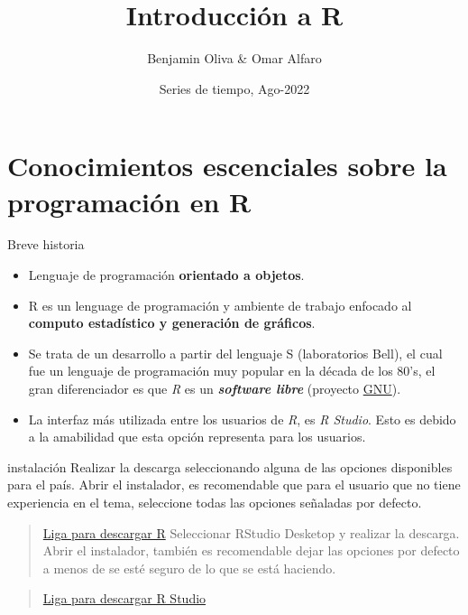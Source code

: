 \documentclass[
  10,
  ignorenonframetext,
]{beamer}
\title{Introducción a R}
\author{Benjamin Oliva \& Omar Alfaro}
\date{Series de tiempo, Ago-2022}
\begin{document}
\frame{\titlepage}

\begin{frame}[allowframebreaks]
  \tableofcontents[hideallsubsections]
\end{frame}
\hypertarget{conocimientos-escenciales-sobre-la-programaciuxf3n-en-r}{%
\section{Conocimientos escenciales sobre la programación en
R}\label{conocimientos-escenciales-sobre-la-programaciuxf3n-en-r}}

\begin{frame}{Breve historia}
\protect\hypertarget{breve-historia}{}
\begin{itemize}
\item
  Lenguaje de programación \textbf{orientado a objetos}.
\item
  R es un lenguage de programación y ambiente de trabajo enfocado al
  \textbf{computo estadístico y generación de gráficos}.
\item
  Se trata de un desarrollo a partir del lenguaje S (laboratorios Bell),
  el cual fue un lenguaje de programación muy popular en la década de
  los 80's, el gran diferenciador es que \emph{R} es un
  \textbf{\emph{software libre}} (proyecto
  \href{http://www.gnu.org/}{GNU}).
\item
  La interfaz más utilizada entre los usuarios de \emph{R}, es \emph{R
  Studio}. Esto es debido a la amabilidad que esta opción representa
  para los usuarios.
\end{itemize}
\end{frame}

\begin{frame}{instalación}
\protect\hypertarget{instalaciuxf3n}{}
Realizar la descarga seleccionando alguna de las opciones disponibles
para el país. Abrir el instalador, es recomendable que para el usuario
que no tiene experiencia en el tema, seleccione todas las opciones
señaladas por defecto.

\begin{quote}
\href{https://cran.r-project.org/mirrors.html}{Liga para descargar R}
Seleccionar RStudio Desketop y realizar la descarga. Abrir el
instalador, también es recomendable dejar las opciones por defecto a
menos de se esté seguro de lo que se está haciendo.
\end{quote}

\begin{quote}
\href{https://rstudio.com/products/rstudio/download/}{Liga para
descargar R Studio}
\end{quote}
\end{frame}
\end{document}
